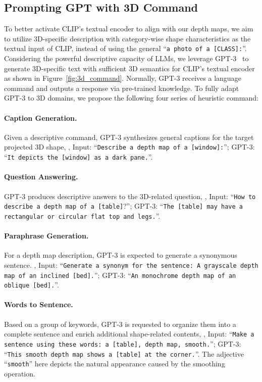 \documentclass[10pt,twocolumn,letterpaper]{article}
\begin{document}
\subsection{Prompting GPT with 3D Command}
\label{method:3D_prompt}

To better activate CLIP's textual encoder to align with our depth maps, we aim to utilize 3D-specific description with category-wise shape characteristics as the textual input of CLIP, instead of using the general ``\texttt{a photo of a [CLASS]:}''. Considering the powerful descriptive capacity of LLMs, we leverage GPT-3~\cite{brown2020language} to generate 3D-specific text with sufficient 3D semantics for CLIP's textual encoder as shown in Figure~\ref{fig:3d_command}. Normally, GPT-3 receives a language command and outputs a response via pre-trained knowledge. To fully adapt GPT-3 to 3D domains, we propose the following four series of heuristic command:

\vspace{-6pt}
\paragraph{Caption Generation.} 
Given a descriptive command, GPT-3 synthesizes general captions for the target projected 3D shape, \eg, Input: ``\texttt{Describe a depth map of a {[window]}:}''; GPT-3: ``\texttt{It depicts the {[window]} as a dark pane.}''.

\vspace{-6pt}
\paragraph{Question Answering.} 
GPT-3 produces descriptive answers to the 3D-related question, \eg, Input: ``\texttt{How to describe a depth map of a [table]}?''; GPT-3: ``\texttt{The {[table]} may have a rectangular or circular flat top and legs.}''.

\vspace{-6pt}
\paragraph{Paraphrase Generation.} 
For a depth map description, GPT-3 is expected to generate a synonymous sentence. \eg, Input: ``\texttt{Generate a synonym for the sentence: A grayscale depth map of an inclined {[bed]}.}''; GPT-3: ``\texttt{An monochrome depth map of an oblique {[bed]}.}''.

\vspace{-6pt}
\paragraph{Words to Sentence.} 
Based on a group of keywords, GPT-3 is requested to organize them into a complete sentence and enrich additional shape-related contents, \eg, Input: ``\texttt{Make a sentence using these words: a {[table]}, depth map, smooth.}''; GPT-3: ``\texttt{This smooth depth map shows a {[table]} at the corner.}''. The adjective ``\texttt{smooth}'' here depicts the natural appearance caused by the smoothing operation.
\end{document}
